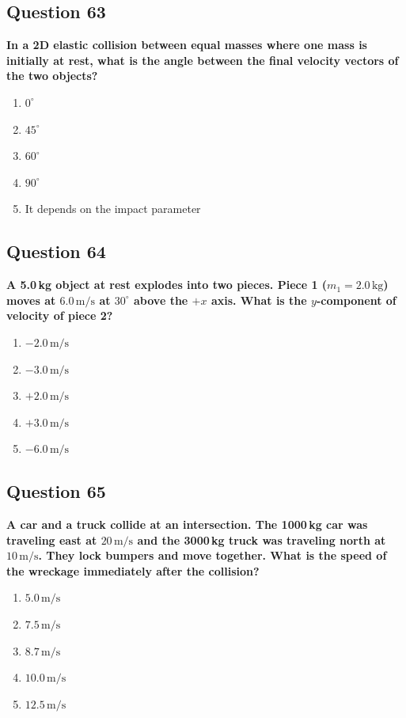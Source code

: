 \documentclass[12pt,letterpaper]{article}
\begin{document}
\subsection{Question 63}

\begin{questionbox}
\textbf{In a 2D elastic collision between equal masses where one mass is initially at rest, what is the angle between the final velocity vectors of the two objects?}

\begin{enumerate}[label=\alph*)]
    \item $0^\circ$
    \item $45^\circ$
    \item $60^\circ$
    \item $90^\circ$
    \item It depends on the impact parameter
\end{enumerate}
\end{questionbox}

\subsection{Question 64}

\begin{questionbox}
\textbf{A 5.0\,kg object at rest explodes into two pieces. Piece 1 ($m_1 = 2.0\,\text{kg}$) moves at $6.0\,\text{m/s}$ at $30^\circ$ above the $+x$ axis. What is the $y$-component of velocity of piece 2?}

\begin{enumerate}[label=\alph*)]
    \item $-2.0\,\text{m/s}$
    \item $-3.0\,\text{m/s}$
    \item $+2.0\,\text{m/s}$
    \item $+3.0\,\text{m/s}$
    \item $-6.0\,\text{m/s}$
\end{enumerate}
\end{questionbox}

\subsection{Question 65}

\begin{questionbox}
\textbf{A car and a truck collide at an intersection. The 1000\,kg car was traveling east at $20\,\text{m/s}$ and the 3000\,kg truck was traveling north at $10\,\text{m/s}$. They lock bumpers and move together. What is the speed of the wreckage immediately after the collision?}

\begin{enumerate}[label=\alph*)]
    \item $5.0\,\text{m/s}$
    \item $7.5\,\text{m/s}$
    \item $8.7\,\text{m/s}$
    \item $10.0\,\text{m/s}$
    \item $12.5\,\text{m/s}$
\end{enumerate}
\end{questionbox}
\end{document}
